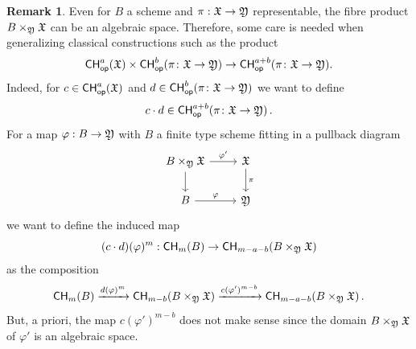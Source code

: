 \documentclass[a4paper,12pt]{article} %
\theoremstyle{definition}
\newtheorem{remark}[definition]{Remark}
\theoremstyle{plain}%
\renewcommand{\phi}{\varphi}
\newcommand{\Chow}{\mathsf{CH}}
\newcommand{\CHop}{\Chow_{\mathsf{op}}}
\newcommand{\jocomment}[1]{}
\begin{document}
                              
\vspace{8pt}                              
\begin{remark}\label{remark:opclassactonalgspaces}         
Even for $B$ a scheme and $\pi: \frak X \to \frak Y$ representable, the fibre product $B \times_{\frak Y}\frak X$ can be an algebraic space. Therefore, some care is needed when generalizing classical constructions such as the product
\[\CHop^{a}(\frak X) \times \CHop^{b}(\pi\colon \frak X \to \frak Y) \to \CHop^{a+b}(\pi\colon \frak X \to \frak Y).\]
Indeed, for $c \in \CHop^{a}(\frak X)$ and  $d \in \CHop^{b}(\pi\colon \frak X \to \frak Y)$  we want to define $$c \cdot d \in \CHop^{a+b}(\pi\colon \frak X \to \frak Y)\, .$$
For a map $\phi: B \to \frak Y$ with $B$ a finite type scheme fitting in a pullback diagram
\[
\begin{tikzcd}
B \times_{\frak Y}\arrow[d] \arrow[r,"\phi'"] \frak X  & \frak X \arrow[d,"\pi"]\\
B \arrow[r,"\phi"] & \frak Y
\end{tikzcd}
\]
we want to define the induced map
\[(c \cdot d)(\phi)^m : \Chow_m(B) \to \Chow_{m-a-b}(B \times_{\frak Y} \frak X)\]
as the composition
\[\Chow_m(B) \xrightarrow{d(\phi)^m} \Chow_{m-b}(B \times_{\frak Y} \frak X) \xrightarrow{c(\phi')^{m-b}} \Chow_{m-a-b}(B \times_{\frak Y} \frak X)\, .\]
But, a priori, the map $c(\phi')^{m-b}$ does not make sense since the domain $B \times_{\frak Y} \frak X$ of $\phi'$ is an algebraic space.

\end{remark}
\end{document}
